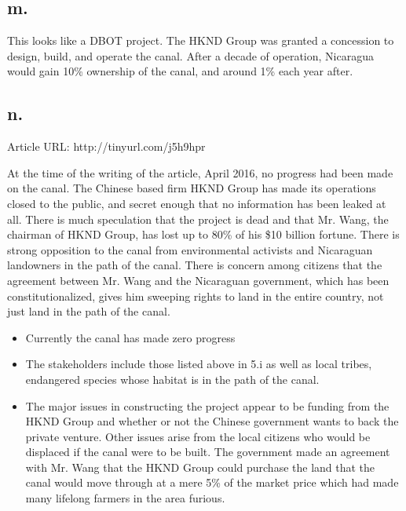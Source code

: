 \documentclass[12pt]{article}
\renewcommand{\=}[1]{\stackrel{#1}{=}} %
\theoremstyle{definition}
\theoremstyle{remark}
\begin{document}
\subsection{m.}
This looks like a DBOT project. The HKND Group was granted a concession to design, build, and operate the canal. After a decade of operation, Nicaragua would gain 10\% ownership of the canal, and around 1\% each year after.

\subsection{n.}
Article URL: {\small http://tinyurl.com/j5h9hpr}\vspace{1em}

At the time of the writing of the article, April 2016, no progress had been made on the canal. The Chinese based firm HKND Group has made its operations closed to the public, and secret enough that no information has been leaked at all. There is much speculation that the project is dead and that Mr. Wang, the chairman of HKND Group, has lost up to 80\% of his \$10 billion fortune. There is strong opposition to the canal from environmental activists and Nicaraguan landowners in the path of the canal. There is concern among citizens that the agreement between Mr. Wang and the Nicaraguan government, which has been constitutionalized, gives him sweeping rights to land in the entire country, not just land in the path of the canal.

\begin{itemize}
	\item Currently the canal has made zero progress
	\item The stakeholders include those listed above in 5.i as well as local tribes, endangered species whose habitat is in the path of the canal.
	\item The major issues in constructing the project appear to be funding from the HKND Group and whether or not the Chinese government wants to back the private venture. Other issues arise from the local citizens who would be displaced if the canal were to be built. The government made an agreement with Mr. Wang that the HKND Group could purchase the land that the canal would move through at a mere 5\% of the market price which had made many lifelong farmers in the area furious.
\end{itemize}
\end{document}
